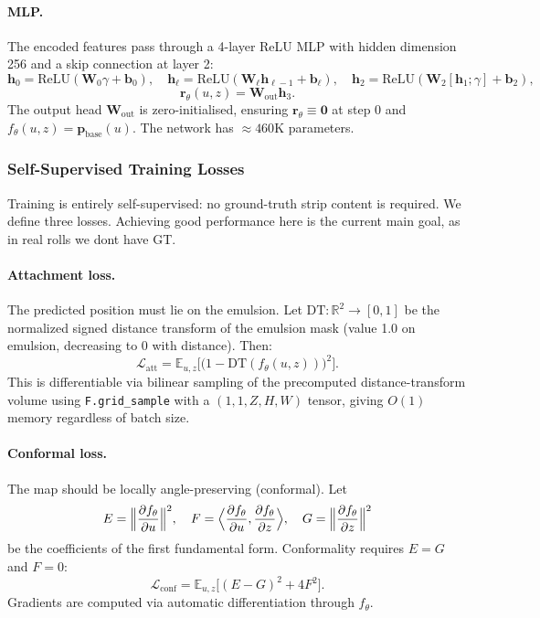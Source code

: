 \documentclass[11pt,a4paper]{article}
\newcommand{\R}{\mathbb{R}}
\newcommand{\E}{\mathbb{E}}
\begin{document}
\paragraph{MLP.} The encoded features pass through a 4-layer ReLU MLP with hidden dimension 256 and a skip connection at layer 2:
\begin{equation}
    \bm{h}_0 = \text{ReLU}(\bm{W}_0 \gamma + \bm{b}_0), \quad
    \bm{h}_\ell = \text{ReLU}(\bm{W}_\ell \bm{h}_{\ell-1} + \bm{b}_\ell), \quad
    \bm{h}_2 = \text{ReLU}(\bm{W}_2 [\bm{h}_1; \gamma] + \bm{b}_2),
\end{equation}
\begin{equation}
    \bm{r}_\theta(u,z) = \bm{W}_{\text{out}} \bm{h}_3.
\end{equation}
The output head $\bm{W}_{\text{out}}$ is zero-initialised, ensuring $\bm{r}_\theta \equiv \bm{0}$ at step 0 and $f_\theta(u, z) = \bm{p}_{\text{base}}(u)$. The network has $\approx 460\text{K}$ parameters.

\subsubsection{Self-Supervised Training Losses}

Training is entirely self-supervised: no ground-truth strip content is required. We define three losses. Achieving good performance here is the current main goal, as in real rolls we dont have GT.

\paragraph{Attachment loss.} The predicted position must lie on the emulsion. Let $\mathrm{DT}: \R^2 \to [0,1]$ be the normalized signed distance transform of the emulsion mask (value 1.0 on emulsion, decreasing to 0 with distance). Then:
\begin{equation}
    \mathcal{L}_{\text{att}} = \E_{u,z}\bigl[\bigl(1 - \mathrm{DT}(f_\theta(u,z))\bigr)^2\bigr].
    \label{eq:loss_att}
\end{equation}
This is differentiable via bilinear sampling of the precomputed distance-transform volume using \texttt{F.grid\_sample} with a $(1,1,Z,H,W)$ tensor, giving $O(1)$ memory regardless of batch size.

\paragraph{Conformal loss.} The map should be locally angle-preserving (conformal). Let
\begin{equation}
    E = \Bigl\|\frac{\partial f_\theta}{\partial u}\Bigr\|^2, \quad
    F = \Bigl\langle\frac{\partial f_\theta}{\partial u}, \frac{\partial f_\theta}{\partial z}\Bigr\rangle, \quad
    G = \Bigl\|\frac{\partial f_\theta}{\partial z}\Bigr\|^2
\end{equation}
be the coefficients of the first fundamental form. Conformality requires $E = G$ and $F = 0$:
\begin{equation}
    \mathcal{L}_{\text{conf}} = \E_{u,z}\bigl[(E - G)^2 + 4F^2\bigr].
    \label{eq:loss_conf}
\end{equation}
Gradients are computed via automatic differentiation through $f_\theta$.
\end{document}
